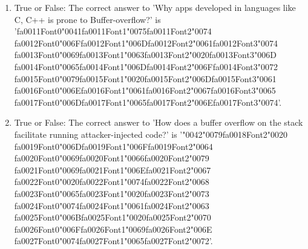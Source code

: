 \documentclass[12pt]{article}
\begin{document}
\begin{enumerate}[label=\arabic*.]
\item True or False: The correct answer to 'Why apps developed in languages like C, C++ is prone to Buffer-overflow?' is '{\csname fa0011Font0\endcsname\char"0041}{\csname fa0011Font1\endcsname\char"0075}{\csname fa0011Font2\endcsname\char"0074} {\csname fa0012Font0\endcsname\char"006F}{\csname fa0012Font1\endcsname\char"006D}{\csname fa0012Font2\endcsname\char"0061}{\csname fa0012Font3\endcsname\char"0074} {\csname fa0013Font0\endcsname\char"0069}{\csname fa0013Font1\endcsname\char"0063}{\csname fa0013Font2\endcsname\char"0020}{\csname fa0013Font3\endcsname\char"006D} {\csname fa0014Font0\endcsname\char"0065}{\csname fa0014Font1\endcsname\char"006D}{\csname fa0014Font2\endcsname\char"006F}{\csname fa0014Font3\endcsname\char"0072} {\csname fa0015Font0\endcsname\char"0079}{\csname fa0015Font1\endcsname\char"0020}{\csname fa0015Font2\endcsname\char"006D}{\csname fa0015Font3\endcsname\char"0061} {\csname fa0016Font0\endcsname\char"006E}{\csname fa0016Font1\endcsname\char"0061}{\csname fa0016Font2\endcsname\char"0067}{\csname fa0016Font3\endcsname\char"0065} {\csname fa0017Font0\endcsname\char"006D}{\csname fa0017Font1\endcsname\char"0065}{\csname fa0017Font2\endcsname\char"006E}{\csname fa0017Font3\endcsname\char"0074}'.
\item True or False: The correct answer to 'How does a buffer overflow on the stack facilitate running attacker-injected code?' is '{\char"0042}{\char"0079}{\csname fa0018Font2\endcsname\char"0020} {\csname fa0019Font0\endcsname\char"006D}{\csname fa0019Font1\endcsname\char"006F}{\csname fa0019Font2\endcsname\char"0064} {\csname fa0020Font0\endcsname\char"0069}{\csname fa0020Font1\endcsname\char"0066}{\csname fa0020Font2\endcsname\char"0079} {\csname fa0021Font0\endcsname\char"0069}{\csname fa0021Font1\endcsname\char"006E}{\csname fa0021Font2\endcsname\char"0067} {\csname fa0022Font0\endcsname\char"0020}{\csname fa0022Font1\endcsname\char"0074}{\csname fa0022Font2\endcsname\char"0068} {\csname fa0023Font0\endcsname\char"0065}{\csname fa0023Font1\endcsname\char"0020}{\csname fa0023Font2\endcsname\char"0073} {\csname fa0024Font0\endcsname\char"0074}{\csname fa0024Font1\endcsname\char"0061}{\csname fa0024Font2\endcsname\char"0063} {\csname fa0025Font0\endcsname\char"006B}{\csname fa0025Font1\endcsname\char"0020}{\csname fa0025Font2\endcsname\char"0070} {\csname fa0026Font0\endcsname\char"006F}{\csname fa0026Font1\endcsname\char"0069}{\csname fa0026Font2\endcsname\char"006E} {\csname fa0027Font0\endcsname\char"0074}{\csname fa0027Font1\endcsname\char"0065}{\csname fa0027Font2\endcsname\char"0072}'.

\end{enumerate}
\end{document}
